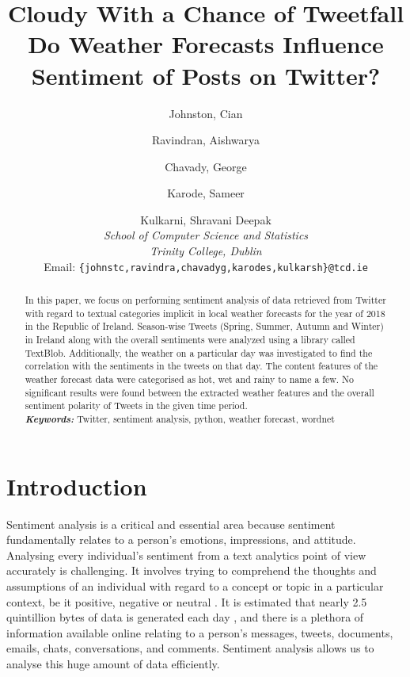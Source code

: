 \documentclass[a4paper,10pt]{article}
\begin{document}
    \title{Cloudy With a Chance of Tweetfall \\ \large{Do Weather Forecasts Influence Sentiment of Posts on Twitter?}}
    \author{
        Johnston, Cian
        \and
        Ravindran, Aishwarya
        \and
        Chavady, George
        \and
        Karode, Sameer
        \and
        Kulkarni, Shravani Deepak \\
        \textit{School of Computer Science and Statistics} \\
        \textit{Trinity College, Dublin} \\
        Email: \texttt{\{johnstc,ravindra,chavadyg,karodes,kulkarsh\}@tcd.ie} \\
    }

    \maketitle

    \begin{abstract}
     In this paper, we focus on performing sentiment analysis of data retrieved from Twitter with regard to textual categories implicit in local weather forecasts for the year of 2018 in the Republic of Ireland. Season-wise Tweets (Spring, Summer, Autumn and Winter) in Ireland along with the overall sentiments were analyzed using a library called TextBlob. Additionally, the weather on a particular day was investigated to find the correlation with the sentiments in the tweets on that day. The content features of the weather forecast data were categorised as hot, wet and rainy to name a few. No significant results were found between the extracted weather features and the overall sentiment polarity of Tweets in the given time period.
    \\
    \textbf{\textit{Keywords:}} Twitter, sentiment analysis, python, weather forecast, wordnet
    \end{abstract}

    \section{Introduction}

    Sentiment analysis is a critical and essential area because sentiment fundamentally relates to a person’s emotions, impressions, and attitude. Analysing every individual’s sentiment from a text analytics point of view accurately is challenging. It involves trying to comprehend the thoughts and assumptions of an individual with regard to a concept or topic in a particular context, be it positive, negative or neutral . It is estimated that nearly 2.5 quintillion bytes of data is generated each day , and there is a plethora of information available online relating to a person’s messages, tweets, documents, emails, chats, conversations, and comments. Sentiment analysis allows us to analyse this huge amount of data efficiently.
\end{document}
